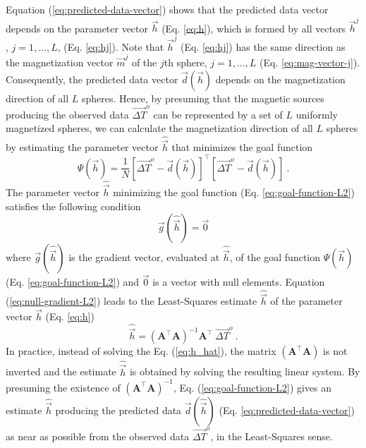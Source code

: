 \documentclass[journal abbreviation, npg]{copernicus}
\begin{document}
Equation (\ref{eq:predicted-data-vector}) shows that the predicted data vector depends on the parameter vector $\vec{h}$ (Eq. \ref{eq:h}), which is formed by all vectors $\vec{h}^{j}$, $j = 1, ..., L$, (Eq. \ref{eq:hj}). Note that $\vec{h}^{j}$ (Eq. \ref{eq:hj}) has the same direction as the magnetization vector $\vec{m}^{j}$ of the $j$th sphere, $j = 1, ..., L$ (Eq. \ref{eq:mag-vector-j}). Consequently, the predicted data vector $\vec{d}(\vec{h})$ depends on the magnetization direction of all $L$ spheres. Hence, by presuming that the magnetic sources producing the observed data $\vec{\Delta T}^{o}$ can be represented by a set of $L$ uniformly magnetized spheres, we can calculate the magnetization direction of all $L$ spheres by estimating the parameter vector $\hat{\vec{h}}$ that minimizes the goal function
\begin{equation}
\Psi(\vec{h}) = \frac{1}{N}[\vec{\Delta T}^{o} - \vec{d}(\vec{h})]^{\intercal}[\vec{\Delta T}^{o} - \vec{d}(\vec{h})] \: .
\label{eq:goal-function-L2}
\end{equation}
The parameter vector $\hat{\vec{h}}$ minimizing the goal function (Eq. \ref{eq:goal-function-L2}) satisfies the following condition
\begin{equation}
\vec{g}(\hat{\vec{h}}) = \vec{0}
\label{eq:null-gradient-L2}
\end{equation}
where $\vec{g}(\hat{\vec{h}})$ is the gradient vector, evaluated at $\hat{\vec{h}}$, of the goal function $\Psi(\vec{h})$ (Eq. \ref{eq:goal-function-L2}) and $\vec{0}$ is a vector with null elements. Equation (\ref{eq:null-gradient-L2}) leads to the Least-Squares estimate $\hat{\vec{h}}$ of the parameter vector $\vec{h}$ (Eq. \ref{eq:h})
\begin{equation}
\hat{\vec{h}} = (\mathbf{A}^{\intercal}\mathbf{A})^{-1} \mathbf{A}^{\intercal} \: \vec{\Delta T}^{o} \: .
\label{eq:h_hat}
\end{equation}
In practice, instead of solving the Eq. (\ref{eq:h_hat}), the matrix $(\mathbf{A}^{\intercal} \mathbf{A})$ is not inverted and the estimate $\hat{\vec{h}}$ is obtained by solving the resulting linear system. By presuming the existence of $(\mathbf{A}^{\intercal} \mathbf{A})^{-1}$, Eq. (\ref{eq:goal-function-L2}) gives an estimate $\hat{\vec{h}}$ producing the predicted data $\vec{d}(\hat{\vec{h}})$ (Eq. \ref{eq:predicted-data-vector}) as near as possible from the observed data $\vec{\Delta T}^{o}$, in the Least-Squares sense.
\end{document}
